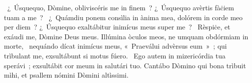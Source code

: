 ~¿~Úsquequo, Dòmine, obliviscéris me in finem~? ¿~Úsquequo avèrtis fàċiem tuam a me~? 
~¿~Quámdiu ponem consìlia in ànima mea, dolórem in corde meo per diem~? ¿~Úsquequo exaltábitur inimícus meus super me~? 
~Rèspiċe, et exáudi me, Dòmine Deus meus. Illúmina òculos meos, ne umquam obdórmiam in morte, 
~nequándo dícat inimícus meus, «~Praeválui advèrsus eum~»~; qui trìbulant me, exsultábunt si motus fúero. 
~Ego autem in mizericórdia tua sperávi~; exsultábit cor meum in salutári tuo. Cantábo Dòmino qui bona trìbuit mìhi, et psallem nómini Dòmini altìssimi. 
